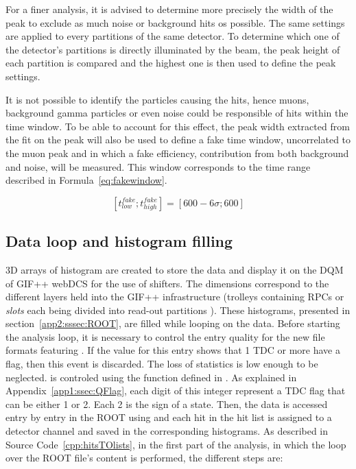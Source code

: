 	For a finer analysis, it is advised to determine more precisely the width of the peak to exclude as much noise or background hits os possible. The same settings are applied to every partitions of the same detector. To determine which one of the detector's partitions is directly illuminated by the beam, the peak height of each partition is compared and the highest one is then used to define the peak settings.
	
	It is not possible to identify the particles causing the hits, hence muons, background gamma particles or even noise could be responsible of hits within the time window. To be able to account for this effect, the peak width extracted from the fit on the peak will also be used to define a fake time window, uncorrelated to the muon peak and in which a fake efficiency, contribution from both background and noise, will be measured. This window corresponds to the time range described in Formula~\ref{eq:fakewindow}.
	
	\begin{equation}
	\label{eq:fakewindow}
		 [t^{fake}_{low};t^{fake}_{high}]  = [600-6\sigma; 600]
	\end{equation}
	
	\subsection{Data loop and histogram filling}
	\label{app2:ssec:dataloop}
	
	3D arrays of histogram are created to store the data and display it on the DQM of GIF++ webDCS for the use of shifters. The dimensions correspond to the different layers held into the GIF++ infrastructure (trolleys  containing RPCs or \textit{slots}  each being divided into read-out partitions ). These histograms, presented in section~\ref{app2:sssec:ROOT}, are filled while looping on the data. Before starting the analysis loop, it is necessary to control the entry quality for the new file formats featuring . If the  value for this entry shows that 1 TDC or more have a  flag, then this event is discarded. The loss of statistics is low enough to be neglected.  is controled using the function  defined in . As explained in Appendix~\ref{app1:ssec:QFlag}, each digit of this integer represent a TDC flag that can be either  1 or 2. Each 2 is the sign of a  state. Then, the data is accessed entry by entry in the ROOT  using  and each hit in the hit list is assigned to a detector channel and saved in the corresponding histograms. As described in Source Code~\ref{cpp:hitsTOlists}, in the first part of the analysis, in which the loop over the ROOT file's content is performed, the different steps are:
	
